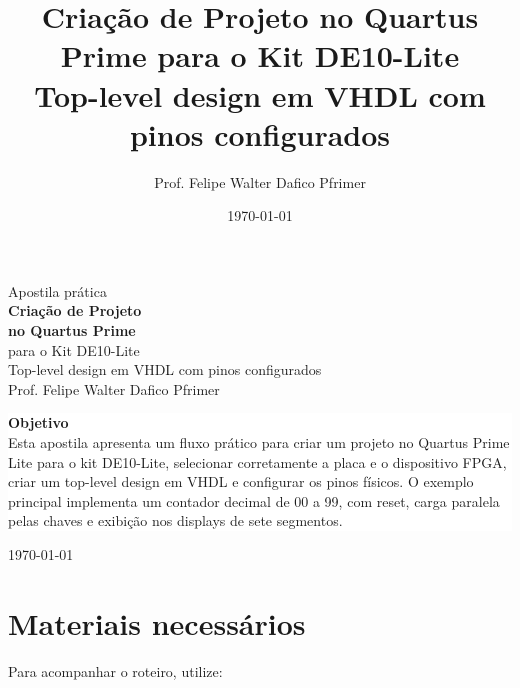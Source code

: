 \documentclass[12pt,a4paper]{article}
\title{\textbf{Criação de Projeto no Quartus Prime para o Kit DE10-Lite}\\
\large Top-level design em VHDL com pinos configurados}
\author{Prof. Felipe Walter Dafico Pfrimer}
\date{\today}
\begin{document}

\begin{titlepage}
\thispagestyle{empty}

\vspace*{2.2cm}
{\sffamily\color{white}
{\Large Apostila prática}\\[1.2cm]
{\Huge\bfseries Criação de Projeto}\\[0.18cm]
{\Huge\bfseries no Quartus Prime}\\[0.45cm]
{\LARGE para o Kit DE10-Lite}\\[1.0cm]
{\Large Top-level design em VHDL com pinos configurados}\\[2.0cm]
{\large Prof. Felipe Walter Dafico Pfrimer}
}

\vfill

\colorbox{white}{
    \parbox{0.88\textwidth}{
        \color{branddark}
        \textbf{\textsf{Objetivo}}\\[0.35em]
        Esta apostila apresenta um fluxo prático para criar um projeto no Quartus Prime Lite para o kit DE10-Lite, selecionar corretamente a placa e o dispositivo FPGA, criar um top-level design em VHDL e configurar os pinos físicos. O exemplo principal implementa um contador decimal de 00 a 99, com reset, carga paralela pelas chaves e exibição nos displays de sete segmentos.
    }
}

\vspace*{1.0cm}
{\sffamily\color{white}\today}
\end{titlepage}

\tableofcontents
\newpage
{}

\section{Materiais necessários}

Para acompanhar o roteiro, utilize:
\end{document}

